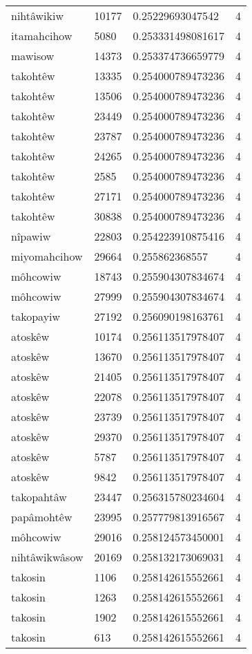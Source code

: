 \begin{longtable}{llll}
nihtâwikiw & 10177 & 0.25229693047542 & 4 \\
itamahcihow & 5080 & 0.253331498081617 & 4 \\
mawisow & 14373 & 0.253374736659779 & 4 \\
takohtêw & 13335 & 0.254000789473236 & 4 \\
takohtêw & 13506 & 0.254000789473236 & 4 \\
takohtêw & 23449 & 0.254000789473236 & 4 \\
takohtêw & 23787 & 0.254000789473236 & 4 \\
takohtêw & 24265 & 0.254000789473236 & 4 \\
takohtêw & 2585 & 0.254000789473236 & 4 \\
takohtêw & 27171 & 0.254000789473236 & 4 \\
takohtêw & 30838 & 0.254000789473236 & 4 \\
nîpawiw & 22803 & 0.254223910875416 & 4 \\
miyomahcihow & 29664 & 0.255862368557 & 4 \\
môhcowiw & 18743 & 0.255904307834674 & 4 \\
môhcowiw & 27999 & 0.255904307834674 & 4 \\
takopayiw & 27192 & 0.256090198163761 & 4 \\
atoskêw & 10174 & 0.256113517978407 & 4 \\
atoskêw & 13670 & 0.256113517978407 & 4 \\
atoskêw & 21405 & 0.256113517978407 & 4 \\
atoskêw & 22078 & 0.256113517978407 & 4 \\
atoskêw & 23739 & 0.256113517978407 & 4 \\
atoskêw & 29370 & 0.256113517978407 & 4 \\
atoskêw & 5787 & 0.256113517978407 & 4 \\
atoskêw & 9842 & 0.256113517978407 & 4 \\
takopahtâw & 23447 & 0.256315780234604 & 4 \\
papâmohtêw & 23995 & 0.257779813916567 & 4 \\
môhcowiw & 29016 & 0.258124573450001 & 4 \\
nihtâwikwâsow & 20169 & 0.258132173069031 & 4 \\
takosin & 1106 & 0.258142615552661 & 4 \\
takosin & 1263 & 0.258142615552661 & 4 \\
takosin & 1902 & 0.258142615552661 & 4 \\
takosin & 613 & 0.258142615552661 & 4 \\

\end{longtable}
